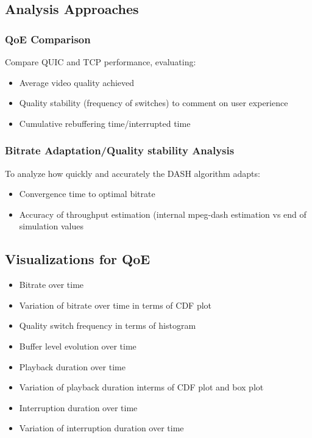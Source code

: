 \documentclass[11pt,a4paper]{article}
\begin{document}
\subsection{Analysis Approaches}

\subsubsection{QoE Comparison}
Compare QUIC and TCP performance, evaluating:
\begin{itemize}
    \item Average video quality achieved
    \item Quality stability (frequency of switches) to comment on user experience
    \item Cumulative rebuffering time/interrupted time
\end{itemize}

\subsubsection{Bitrate Adaptation/Quality stability Analysis}
To analyze how quickly and accurately the DASH algorithm adapts:
\begin{itemize}
    \item Convergence time to optimal bitrate
    \item Accuracy of throughput estimation (internal mpeg-dash estimation vs end of simulation values
\end{itemize}

\subsection{Visualizations for QoE}
\begin{itemize}
    \item Bitrate over time
    \item Variation of bitrate over time in terms of CDF plot
    \item Quality switch frequency in terms of histogram
    \item Buffer level evolution over time
    \item Playback duration over time
    \item Variation of playback duration interms of CDF plot and box plot
    \item Interruption duration over time
    \item Variation of interruption duration over time
\end{itemize}
\end{document}
